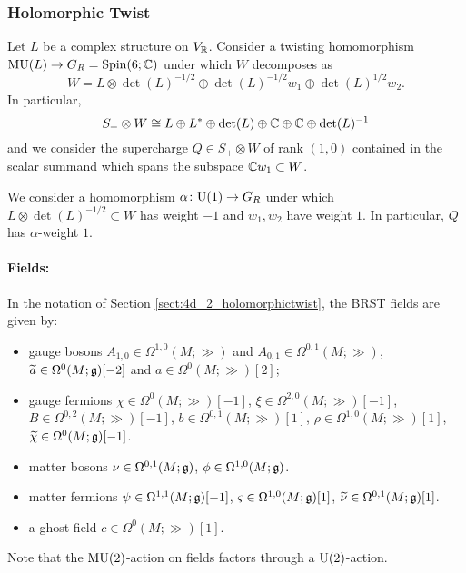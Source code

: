 \documentclass[10pt, oneside]{article}
\begin{document}
\subsubsection{Holomorphic Twist}
\label{sect:4d4holomorphictwist}

Let $L$ be a complex structure on $V_\RR$. Consider a twisting homomorphism $\MU(L)\rightarrow G_R=\Spin(6; \CC)$ under which $W$ decomposes as
\[W = L\otimes \det(L)^{-1/2}\oplus \det(L)^{-1/2} w_1\oplus \det(L)^{1/2} w_2.\]
In particular,
\[S_+\otimes W\cong L\oplus L^*\oplus \det(L)\oplus \CC \oplus \CC\oplus \det(L)^{-1}\]
and we consider the supercharge $Q\in S_+\otimes W$ of rank $(1, 0)$ contained in the scalar summand which spans the subspace $\CC w_1\subset W$.

We consider a homomorphism $\alpha\colon \U(1)\rightarrow G_R$ under which $L\otimes \det(L)^{-1/2}\subset W$ has weight $-1$ and $w_1,w_2$ have weight $1$. In particular, $Q$ has $\alpha$-weight $1$.

\vspace{-10pt}
\paragraph{Fields:} In the notation of Section \ref{sect:4d_2_holomorphictwist}, the BRST fields are given by:
\begin{itemize}
\item gauge bosons $A_{1, 0}\in\Omega^{1, 0}(M; \gg)$ and $A_{0, 1}\in\Omega^{0, 1}(M; \gg)$, $\Tilde{a} \in \Omega^{0}(M; \gg)[-2]$ and $a \in\Omega^{0}(M; \gg)[2]$;
\item gauge fermions $\chi \in \Omega^0(M ; \gg)[-1]$, $\xi \in \Omega^{2,0}(M ; \gg)[-1]$, $B \in \Omega^{0,2}(M ; \gg)[-1]$, $b \in \Omega^{0,1}(M ; \gg)[1]$, $\rho \in \Omega^{1,0}(M ; \gg)[1]$,  $\Tilde{\chi} \in \Omega^0(M ; \gg)[-1]$.
\item matter bosons $\nu\in\Omega^{0, 1}(M; \fg)$, $\phi\in\Omega^{1,0}(M; \fg)$.
\item matter fermions $\psi \in \Omega^{1,1} (M;  \fg)[-1]$, $\varsigma \in \Omega^{1,0} (M ; \fg)[1]$, $\Tilde{\nu} \in \Omega^{0,1}(M; \fg)[1]$.
\item a ghost field $c\in \Omega^0(M; \gg)[1]$.
\end{itemize}

Note that the $\MU(2)$-action on fields factors through a $\U(2)$-action.
\end{document}
